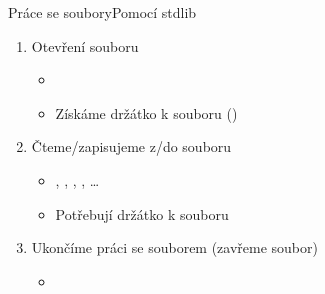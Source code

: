\begin{frame}{Práce se soubory}{Pomocí stdlib}

  \begin{enumerate}
    \item Otevření souboru
    \begin{itemize}
      \item {}
      \item Získáme držátko k souboru ()
    \end{itemize}

    \pause

    \item Čteme/zapisujeme z/do souboru
    \begin{itemize}
      \item {}, , , , \dots
      \item Potřebují držátko k souboru
    \end{itemize}

    \pause

    \item Ukončíme práci se souborem (zavřeme soubor)
    \begin{itemize}
      \item {}
    \end{itemize}

  \end{enumerate}

\end{frame}

